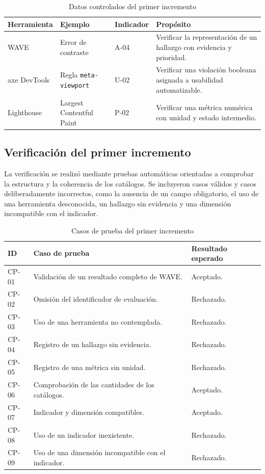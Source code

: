 \begin{table}[H]
\centering
\caption{Datos controlados del primer incremento}
\label{tab:datos-controlados-implementacion}
\begin{tabularx}{\textwidth}{p{3.0cm}p{3.4cm}p{2.8cm}X}
\toprule
\textbf{Herramienta} & \textbf{Ejemplo} & \textbf{Indicador} & \textbf{Propósito}\\
\midrule
WAVE & Error de contraste & A-04 & Verificar la representación de un hallazgo con evidencia y prioridad.\\
axe DevTools & Regla \texttt{meta-viewport} & U-02 & Verificar una violación booleana asignada a usabilidad automatizable.\\
Lighthouse & Largest Contentful Paint & P-02 & Verificar una métrica numérica con unidad y estado intermedio.\\
\bottomrule
\end{tabularx}
\end{table}

\subsection{Verificación del primer incremento}

La verificación se realizó mediante pruebas automáticas orientadas a comprobar
la estructura y la coherencia de los catálogos. Se incluyeron casos válidos y
casos deliberadamente incorrectos, como la ausencia de un campo obligatorio,
el uso de una herramienta desconocida, un hallazgo sin evidencia y una
dimensión incompatible con el indicador.

\begin{table}[H]
\centering
\caption{Casos de prueba del primer incremento}
\label{tab:pruebas-primer-incremento}
\begin{tabularx}{\textwidth}{p{1.2cm}X p{3.0cm}}
\toprule
\textbf{ID} & \textbf{Caso de prueba} & \textbf{Resultado esperado}\\
\midrule
CP-01 & Validación de un resultado completo de WAVE. & Aceptado.\\
CP-02 & Omisión del identificador de evaluación. & Rechazado.\\
CP-03 & Uso de una herramienta no contemplada. & Rechazado.\\
CP-04 & Registro de un hallazgo sin evidencia. & Rechazado.\\
CP-05 & Registro de una métrica sin unidad. & Rechazado.\\
CP-06 & Comprobación de las cantidades de los catálogos. & Aceptado.\\
CP-07 & Indicador y dimensión compatibles. & Aceptado.\\
CP-08 & Uso de un indicador inexistente. & Rechazado.\\
CP-09 & Uso de una dimensión incompatible con el indicador. & Rechazado.\\
\bottomrule
\end{tabularx}
\end{table}

